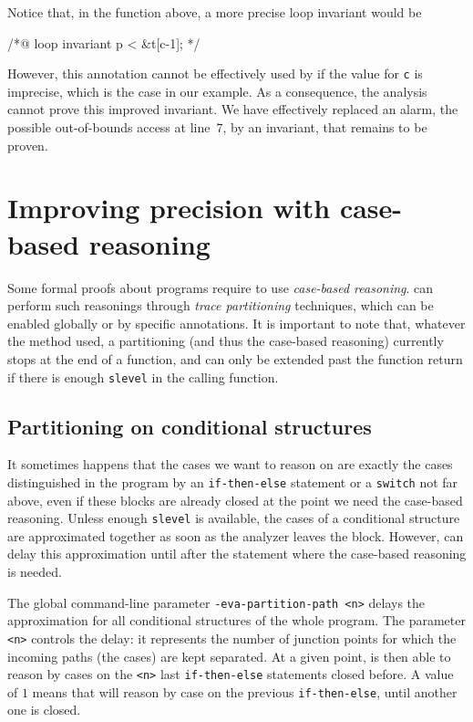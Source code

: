 \documentclass{frama-c-book}
\begin{document}
Notice that, in the function above, a more precise loop invariant would be
\begin{listing-nonumber}
/*@ loop invariant p < &t[c-1]; */
\end{listing-nonumber}
However, this annotation cannot be effectively used by \Eva{}
if the value for \lstinline+c+ is imprecise, which is the case in our
example. As a consequence, the analysis cannot prove this improved invariant.
We have effectively replaced an alarm, the possible out-of-bounds access at
line~7, by an invariant, that remains to be proven.


\section{Improving precision with case-based reasoning}
\label{trace-partitioning}

Some formal proofs about programs require to use \emph{case-based reasoning}.
\Eva{} can perform such reasonings through \emph{trace partitioning}
\cite{trace-partitioning} techniques, which can be enabled globally or
by specific annotations. It is important to note that, whatever the method used,
a partitioning (and thus the case-based reasoning) currently stops at the end of
a function, and can only be extended past the function return if there is enough
\lstinline|slevel| in the calling function.


\subsection{Partitioning on conditional structures}
\label{partitioning-conditional-structures}

It sometimes happens that the cases we want to reason on are exactly the
cases distinguished in the program by an \lstinline|if-then-else| statement or a
\lstinline|switch| not far above, even if these blocks are already closed
at the point we need the case-based reasoning. Unless enough
\lstinline|slevel| is available, the cases of a conditional structure are
approximated together as soon as the analyzer leaves the block. However, \Eva{}
can delay this approximation until after the statement where the case-based
reasoning is needed.

The global command-line parameter \lstinline|-eva-partition-path <n>|
delays the approximation for all conditional structures of the whole
program. The parameter \lstinline|<n>| controls the delay:
it represents the number of junction points for which the incoming
paths (the cases) are kept separated. At a given point, \Eva{} is then able to
reason by cases on the \lstinline|<n>| last \lstinline|if-then-else| statements
closed before.
A value of $1$ means that \Eva{} will reason by
case on the previous \lstinline|if-then-else|, until another one is closed.
\end{document}

